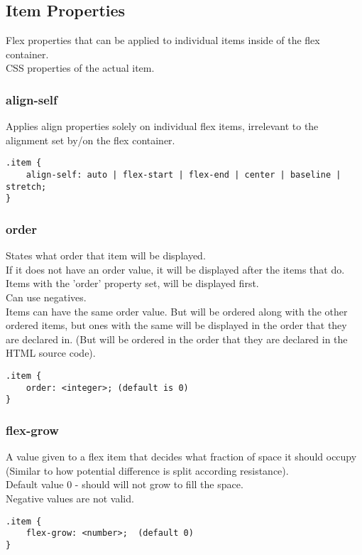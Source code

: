 \documentclass[]{article}
\newcommand{\<}{\guilsinglleft}
\renewcommand{\>}{\guilsinglright}
\begin{document}
\subsection{Item Properties}
Flex properties that can be applied to individual items inside of the flex container.  
\\
CSS properties of the actual item.

\subsubsection{align-self}
Applies align properties solely on individual flex items, irrelevant to the alignment set by/on the flex container.
\begin{lstlisting}
.item {
	align-self: auto | flex-start | flex-end | center | baseline | stretch;
}
\end{lstlisting}

\subsubsection{order}
States what order that item will be displayed.
\\
If it does not have an order value, it will be displayed after the items that do.  
\\
Items with the 'order' property set, will be displayed first.
\\
Can use negatives.
\\
Items can have the same order value.  But will be ordered along with the other ordered items, but ones with the same will be displayed in the order that they are declared in.  (But will be ordered in the order that they are declared in the HTML source code).
\begin{lstlisting}
.item {
	order: <integer>; (default is 0)
}
\end{lstlisting}

\subsubsection{flex-grow}
A value given to a flex item that decides what fraction of space it should occupy (Similar to how potential difference is split according resistance).
\\
Default value 0 - should will not grow to fill the space.
\\
Negative values are not valid.
\begin{lstlisting}
.item {
	flex-grow: <number>;  (default 0) 
}
\end{lstlisting}
\end{document}
